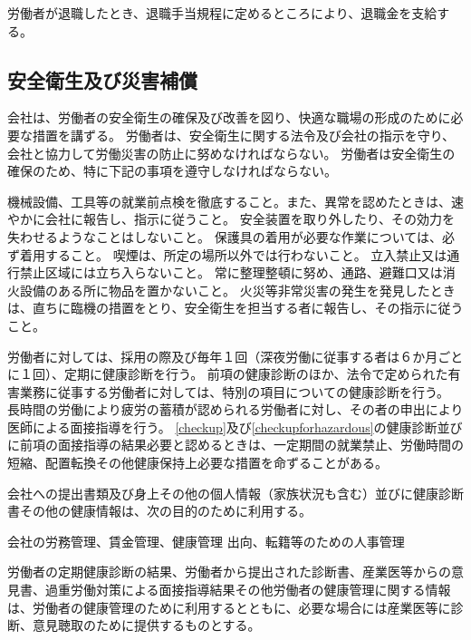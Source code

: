 \documentclass[10pt,a4paper]{jsarticle}
\begin{document}
労働者が退職したとき、退職手当規程に定めるところにより、退職金を支給する。
\label{para:severance}

\subsection{安全衛生及び災害補償}

会社は、労働者の安全衛生の確保及び改善を図り、快適な職場の形成のために必要な措置を講ずる。
\term
労働者は、安全衛生に関する法令及び会社の指示を守り、会社と協力して労働災害の防止に努めなければならない。
\term
労働者は安全衛生の確保のため、特に下記の事項を遵守しなければならない。
\begin{enumerate}
    \itm 機械設備、工具等の就業前点検を徹底すること。また、異常を認めたときは、速やかに会社に報告し、指示に従うこと。
    \itm 安全装置を取り外したり、その効力を失わせるようなことはしないこと。
    \itm 保護具の着用が必要な作業については、必ず着用すること。
    \itm 喫煙は、所定の場所以外では行わないこと。
    \itm 立入禁止又は通行禁止区域には立ち入らないこと。
    \itm 常に整理整頓に努め、通路、避難口又は消火設備のある所に物品を置かないこと。
    \itm 火災等非常災害の発生を発見したときは、直ちに臨機の措置をとり、安全衛生を担当する者に報告し、その指示に従うこと。
\end{enumerate}

労働者に対しては、採用の際及び毎年１回（深夜労働に従事する者は６か月ごとに１回）、定期に健康診断を行う。
\label{checkup}
\term
 前項の健康診断のほか、法令で定められた有害業務に従事する労働者に対しては、特別の項目についての健康診断を行う。
\label{checkupforhazardous}
\term
長時間の労働により疲労の蓄積が認められる労働者に対し、その者の申出により医師による面接指導を行う。
\term
\ref{checkup}及び\ref{checkupforhazardous}の健康診断並びに前項の面接指導の結果必要と認めるときは、一定期間の就業禁止、労働時間の短縮、配置転換その他健康保持上必要な措置を命ずることがある。

会社への提出書類及び身上その他の個人情報（家族状況も含む）並びに健康診断書その他の健康情報は、次の目的のために利用する。
\begin{enumerate}
    \itm 会社の労務管理、賃金管理、健康管理
    \itm 出向、転籍等のための人事管理
\end{enumerate}
\term
労働者の定期健康診断の結果、労働者から提出された診断書、産業医等からの意見書、過重労働対策による面接指導結果その他労働者の健康管理に関する情報は、労働者の健康管理のために利用するとともに、必要な場合には産業医等に診断、意見聴取のために提供するものとする。
\end{document}
